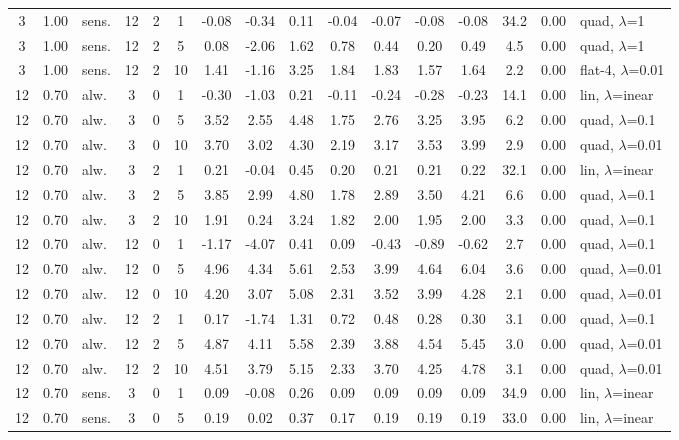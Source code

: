 \documentclass[10pt]{article}
\begin{document}
\begin{scriptsize}
\begin{longtable}{cclcc c ccc ccc c cc l}
3 & 1.00 & sens. & 12 & 2 & 1 & -0.08 & -0.34 & 0.11 & -0.04 & -0.07 & -0.08 & -0.08 & 34.2 & 0.00 & quad, $\lambda$=1 \\
3 & 1.00 & sens. & 12 & 2 & 5 & 0.08 & -2.06 & 1.62 & 0.78 & 0.44 & 0.20 & 0.49 & 4.5 & 0.00 & quad, $\lambda$=1 \\
3 & 1.00 & sens. & 12 & 2 & 10 & 1.41 & -1.16 & 3.25 & 1.84 & 1.83 & 1.57 & 1.64 & 2.2 & 0.00 & flat-4, $\lambda$=0.01 \\
12 & 0.70 & alw. & 3 & 0 & 1 & -0.30 & -1.03 & 0.21 & -0.11 & -0.24 & -0.28 & -0.23 & 14.1 & 0.00 & lin, $\lambda$=inear \\
12 & 0.70 & alw. & 3 & 0 & 5 & 3.52 & 2.55 & 4.48 & 1.75 & 2.76 & 3.25 & 3.95 & 6.2 & 0.00 & quad, $\lambda$=0.1 \\
12 & 0.70 & alw. & 3 & 0 & 10 & 3.70 & 3.02 & 4.30 & 2.19 & 3.17 & 3.53 & 3.99 & 2.9 & 0.00 & quad, $\lambda$=0.01 \\
12 & 0.70 & alw. & 3 & 2 & 1 & 0.21 & -0.04 & 0.45 & 0.20 & 0.21 & 0.21 & 0.22 & 32.1 & 0.00 & lin, $\lambda$=inear \\
12 & 0.70 & alw. & 3 & 2 & 5 & 3.85 & 2.99 & 4.80 & 1.78 & 2.89 & 3.50 & 4.21 & 6.6 & 0.00 & quad, $\lambda$=0.1 \\
12 & 0.70 & alw. & 3 & 2 & 10 & 1.91 & 0.24 & 3.24 & 1.82 & 2.00 & 1.95 & 2.00 & 3.3 & 0.00 & quad, $\lambda$=0.1 \\
12 & 0.70 & alw. & 12 & 0 & 1 & -1.17 & -4.07 & 0.41 & 0.09 & -0.43 & -0.89 & -0.62 & 2.7 & 0.00 & quad, $\lambda$=0.1 \\
12 & 0.70 & alw. & 12 & 0 & 5 & 4.96 & 4.34 & 5.61 & 2.53 & 3.99 & 4.64 & 6.04 & 3.6 & 0.00 & quad, $\lambda$=0.01 \\
12 & 0.70 & alw. & 12 & 0 & 10 & 4.20 & 3.07 & 5.08 & 2.31 & 3.52 & 3.99 & 4.28 & 2.1 & 0.00 & quad, $\lambda$=0.01 \\
12 & 0.70 & alw. & 12 & 2 & 1 & 0.17 & -1.74 & 1.31 & 0.72 & 0.48 & 0.28 & 0.30 & 3.1 & 0.00 & quad, $\lambda$=0.1 \\
12 & 0.70 & alw. & 12 & 2 & 5 & 4.87 & 4.11 & 5.58 & 2.39 & 3.88 & 4.54 & 5.45 & 3.0 & 0.00 & quad, $\lambda$=0.01 \\
12 & 0.70 & alw. & 12 & 2 & 10 & 4.51 & 3.79 & 5.15 & 2.33 & 3.70 & 4.25 & 4.78 & 3.1 & 0.00 & quad, $\lambda$=0.01 \\
12 & 0.70 & sens. & 3 & 0 & 1 & 0.09 & -0.08 & 0.26 & 0.09 & 0.09 & 0.09 & 0.09 & 34.9 & 0.00 & lin, $\lambda$=inear \\
12 & 0.70 & sens. & 3 & 0 & 5 & 0.19 & 0.02 & 0.37 & 0.17 & 0.19 & 0.19 & 0.19 & 33.0 & 0.00 & lin, $\lambda$=inear \\

\end{longtable}
\end{scriptsize}
\end{document}
